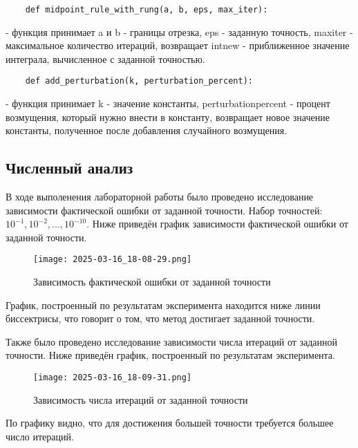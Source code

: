 \documentclass[12pt]{article}
\begin{document}
\begin{lstlisting}
    def midpoint_rule_with_rung(a, b, eps, max_iter):
\end{lstlisting} - функция принимает a и b - границы отрезка, eps - заданную точность, maxiter - максимальное количество итераций, возвращает intnew - приближенное значение интеграла, вычисленное с заданной точностью.

\begin{lstlisting}
    def add_perturbation(k, perturbation_percent):
\end{lstlisting} - функция принимает k - значение константы, perturbationpercent - процент возмущения, который нужно внести в константу, возвращает новое значение константы, полученное после добавления случайного возмущения.

\begin{center}
    \section{Численный анализ}
\end{center}

В ходе выполенения лабораторной работы было проведено исследование зависимости фактической ошибки от заданной точности. Набор точностей: $10^{-1}, 10^{-2}, ..., 10^{-10}.$ Ниже приведён график зависимости фактической ошибки от заданной точности.

\begin{figure}[H]
    \centering
    \texttt{[image: 2025-03-16\_18-08-29.png]}
    \caption{Зависимость фактической ошибки от заданной точности}
    \label{fig:enter-label}
\end{figure}

График, построенный по результатам эксперимента находится ниже линии биссектрисы, что говорит о том, что метод достигает заданной точности.

Также было проведено исследование зависимости числа итераций от заданной точности.
Ниже приведён график, построенный по результатам эксперимента.

\begin{figure}[H]
    \centering
    \texttt{[image: 2025-03-16\_18-09-31.png]}
    \caption{Зависимость числа итераций от заданной точности}
    \label{fig:enter-label}
\end{figure}

По графику видно, что для достижения большей точности требуется большее число итераций.
\end{document}
